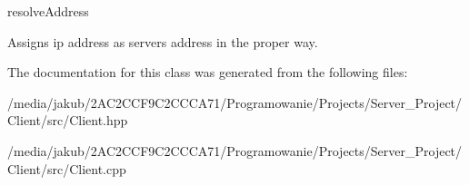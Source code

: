 resolve\+Address 

Assigns ip address as server\textquotesingle{}s address in the proper way. 

The documentation for this class was generated from the following files\+:\begin{DoxyCompactItemize}
\item 
/media/jakub/2\+A\+C2\+C\+C\+F9\+C2\+C\+C\+C\+A71/\+Programowanie/\+Projects/\+Server\+\_\+\+Project/\+Client/src/Client.\+hpp\item 
/media/jakub/2\+A\+C2\+C\+C\+F9\+C2\+C\+C\+C\+A71/\+Programowanie/\+Projects/\+Server\+\_\+\+Project/\+Client/src/Client.\+cpp\end{DoxyCompactItemize}
